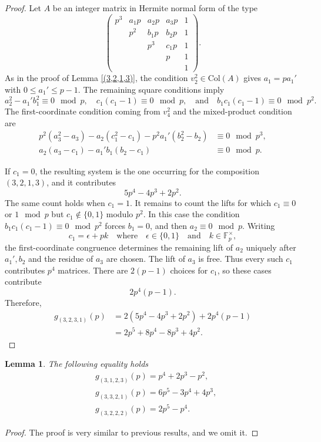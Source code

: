 \documentclass[a4paper]{amsart}
\newtheorem{lemma}[theorem]{Lemma}
\numberwithin{equation}{section}
\theoremstyle{remark}
\newcommand{\F}{\mathbb{F}}
\renewcommand{\Col}{\mathrm{Col}}
\begin{document}
\begin{proof}
Let $A$ be an integer matrix in Hermite normal form of the type
$$
\begin{pmatrix}
p^3&a_1p&a_2p&a_3p&1\\
&p^2&b_1p&b_2p&1\\
&&p^3&c_1p&1\\
&&&p&1\\
&&&&1
\end{pmatrix}.
$$
As in the proof of Lemma \ref{(3,2,1,3)}, the condition $v_2^2\in\Col(A)$ gives $a_1=pa_1'$ with $0\leq a_1'\leq p-1$. The remaining square conditions imply
\[a_2^2-a_1'b_1^2\equiv0\mod p,\quad c_1(c_1-1)\equiv0\mod p,\quad\text{and}\quad b_1c_1(c_1-1)\equiv0\mod p^2.\]
The first-coordinate condition coming from $v_4^2$ and the mixed-product condition are
\begin{align*}
p^2(a_3^2-a_3)-a_2(c_1^2-c_1)-p^2a_1'(b_2^2-b_2)&\equiv0\mod p^3,\\
a_2(a_3-c_1)-a_1'b_1(b_2-c_1)&\equiv0\mod p.
\end{align*}

If $c_1=0$, the resulting system is the one occurring for the composition $(3,2,1,3)$, and it contributes
\[5p^4-4p^3+2p^2.\]
The same count holds when $c_1=1$. It remains to count the lifts for which $c_1\equiv0$ or $1\mod p$ but $c_1\notin\{0,1\}$ modulo $p^2$. In this case the condition $b_1c_1(c_1-1)\equiv0\mod p^2$ forces $b_1=0$, and then $a_2\equiv0\mod p$. Writing
\[c_1=\epsilon+pk\quad\text{where}\quad \epsilon\in\{0,1\}\quad\text{and}\quad k\in\F_p^\times,\]
the first-coordinate congruence determines the remaining lift of $a_2$ uniquely after $a_1',b_2$ and the residue of $a_3$ are chosen. The lift of $a_3$ is free. Thus every such $c_1$ contributes $p^4$ matrices. There are $2(p-1)$ choices for $c_1$, so these cases contribute
\[2p^4(p-1).\]
Therefore,
\begin{align*}
g_{(3,2,3,1)}(p)
&=2(5p^4-4p^3+2p^2)+2p^4(p-1)\\
&=2p^5+8p^4-8p^3+4p^2.
\end{align*}
\end{proof}
\begin{lemma}
    The following equality holds
    \[\begin{split}
        &g_{(3,1,2,3)}(p) = p^4 + 2p^3 - p^2,\\
        &g_{(3,3,2,1)}(p) = 6p^5-3p^4+4p^3,\\
        &g_{(3,2,2,2)}(p) = 2p^5-p^4.
    \end{split}\]
\end{lemma}
\begin{proof}
The proof is very similar to previous results, and we omit it.
\end{proof}
\end{document}
